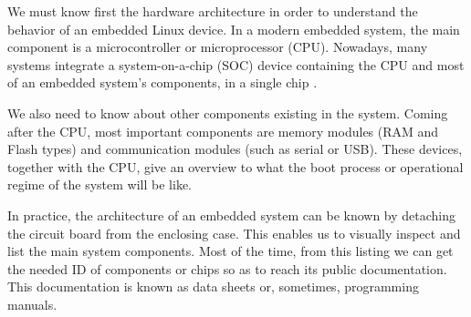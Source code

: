 \documentclass[conference]{IEEEtran}
\newcommand{\nota}[1]{}
\begin{document}
\nota{Para entender el funcionamiento de un dispositivo Linux embebido, es necesario, en primer lugar, conocer
la arquitectura de hardware. En un sistema embebido moderno la arquitectura
contiene como componente central, un microcontrolador o microprocesador (CPU).
Mas aún, actualmente, muchos sistemas contienen un SOC (del inglés ``system on chip''),
que contiene la CPU y gran parte de los componentes de un sistema embebido, en un
único chip \cite{arm}.
}

We must know first the hardware architecture in order to understand the behavior of an embedded Linux device. In a modern embedded system, the main component is a microcontroller or microprocessor (CPU). Nowadays, many systems integrate a system-on-a-chip (SOC) device containing the CPU and most of an embedded system's components, in a single chip \cite{arm}.


\nota {Además, es de interés conocer cuáles otros componentes conforman
el sistema. Los mas importantes, luego de conocer la CPU,
son los módulos de memoria (de
tipo RAM y de tipo FLASH), y los módulos de comunicaciones (serial, usb, etc).
Ya que, en conjunto con el microprocesador, suelen dar una visión
global de cómo inicia o funciona el sistema.
}

We also need to know about other components existing in the system. Coming after the CPU, most important components are memory modules (RAM and Flash types) and communication modules (such as serial or USB). These devices, together with the CPU, give an overview to what the boot process or operational regime of the system will be like.

\nota {En la práctica, la arquitectura de un sistema embebido particular puede conocerse desmontando
la placa del circuito impreso de la caja exterior. Esto posibilita
inspeccionar visualmente y listar todos los componentes principales con los
que está compuesto el sistema. A partir de este listado, puede
obtenerse, en la mayoría de los casos, la documentación pública
de cada uno de los componentes o chips listados.
A este tipo de documentación se conoce como hoja de datos, o
en algunos casos (como el de las memorias o CPU) manuales de programación
del chip.}

In practice, the architecture of an embedded system can be known by detaching the circuit board from the enclosing case. This enables us to visually inspect and list the main system components. Most of the time, from this listing we can get the needed ID of components or chips so as to reach its public documentation. This documentation is known as data sheets or, sometimes, programming manuals.
\end{document}
